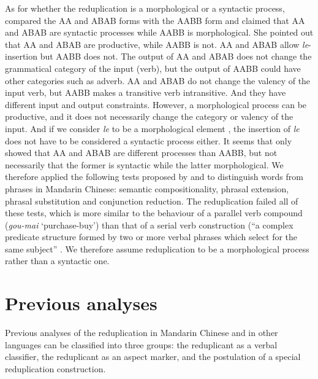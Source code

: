 \documentclass[
a4paper,
10pt,
oneside,
]{scrartcl}
\begin{document}
As for whether the reduplication is a morphological or a syntactic process, \citet{Xie2020} compared
the AA and ABAB forms with the AABB form and claimed that AA and ABAB are syntactic processes while
AABB is morphological. She pointed out that AA and ABAB are productive, while AABB is not. AA and
ABAB allow \emph{le}-insertion but AABB does not. The output of AA and ABAB does not change the
grammatical category of the input (verb), but the output of AABB could have other categories such as
adverb. AA and ABAB do not change the valency of the input verb, but AABB makes a transitive verb
intransitive. And they have different input and output constraints. However, a morphological process
can be productive, and it does not necessarily change the category or valency of the input. And if
we consider \emph{le} to be a morphological element \citep{Huangetal2009,
  MuellerLipenkova2013-short}, the insertion of \emph{le} does not have to be considered a syntactic
process either. It seems that \citet{Xie2020} only showed that AA and ABAB are different processes
than AABB, but not necessarily that the former is syntactic while the latter morphological. We
therefore applied the following tests proposed by \citet{Duanmu1998} and \citet{Schaefer2009} to
distinguish words from phrases in Mandarin Chinese: semantic compositionality, phrasal extension,
phrasal substitution and conjunction reduction. The reduplication failed all of these tests, which
is more similar to the behaviour of a parallel verb compound (\emph{gou-mai} `purchase-buy') than
that of a serial verb construction (``a complex predicate structure formed by two or more verbal
phrases which select for the same subject'' \citep[235]{MuellerLipenkova2009-short}. We therefore
assume reduplication to be a morphological process rather than a syntactic one. 



\section[Previous analyses]{Previous analyses}\label{sec:Prev}

Previous analyses of the reduplication in Mandarin Chinese and in other languages can be classified
into three groups: the reduplicant as a verbal classifier, the reduplicant as an aspect marker, and
the postulation of a special reduplication construction. 
\end{document}
